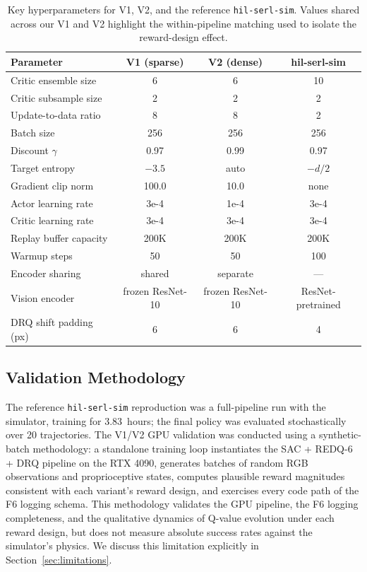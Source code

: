 \documentclass[12pt,a4paper]{article}
\begin{document}
\begin{table}[t]
\centering
\caption{Key hyperparameters for V1, V2, and the reference \texttt{hil-serl-sim}. Values shared across our V1 and V2 highlight the within-pipeline matching used to isolate the reward-design effect.}
\label{tab:hyperparameters}
\small
\begin{tabular}{lccc}
\toprule
\textbf{Parameter} & \textbf{V1 (sparse)} & \textbf{V2 (dense)} & \textbf{hil-serl-sim} \\
\midrule
Critic ensemble size      & 6     & 6     & 10 \\
Critic subsample size     & 2     & 2     & 2 \\
Update-to-data ratio      & 8     & 8     & 2 \\
Batch size                & 256   & 256   & 256 \\
Discount $\gamma$         & 0.97  & 0.99  & 0.97 \\
Target entropy            & $-3.5$ & auto  & $-d/2$ \\
Gradient clip norm        & 100.0 & 10.0  & none \\
Actor learning rate       & 3e-4  & 1e-4  & 3e-4 \\
Critic learning rate      & 3e-4  & 3e-4  & 3e-4 \\
Replay buffer capacity    & 200K  & 200K  & 200K \\
Warmup steps              & 50    & 50    & 100 \\
Encoder sharing           & shared & separate & --- \\
Vision encoder            & frozen ResNet-10 & frozen ResNet-10 & ResNet-pretrained \\
DRQ shift padding (px)    & 6     & 6     & 4 \\
\bottomrule
\end{tabular}
\end{table}

\subsection{Validation Methodology}

The reference \texttt{hil-serl-sim} reproduction was a full-pipeline run with the simulator, training for 3.83~hours; the final policy was evaluated stochastically over 20 trajectories. The V1/V2 GPU validation was conducted using a synthetic-batch methodology: a standalone training loop instantiates the SAC + REDQ-6 + DRQ pipeline on the RTX 4090, generates batches of random RGB observations and proprioceptive states, computes plausible reward magnitudes consistent with each variant's reward design, and exercises every code path of the F6 logging schema. This methodology validates the GPU pipeline, the F6 logging completeness, and the qualitative dynamics of Q-value evolution under each reward design, but does not measure absolute success rates against the simulator's physics. We discuss this limitation explicitly in Section~\ref{sec:limitations}.
\end{document}
